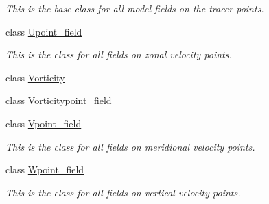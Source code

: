\begin{DoxyCompactItemize}
\begin{DoxyCompactList}\small\item\em This is the base class for all model fields on the tracer points. \end{DoxyCompactList}\item 
class \hyperlink{classmitgcm_1_1core_1_1Upoint__field}{Upoint\+\_\+field}
\begin{DoxyCompactList}\small\item\em This is the class for all fields on zonal velocity points. \end{DoxyCompactList}\item 
class \hyperlink{classmitgcm_1_1core_1_1Vorticity}{Vorticity}
\item 
class \hyperlink{classmitgcm_1_1core_1_1Vorticitypoint__field}{Vorticitypoint\+\_\+field}
\item 
class \hyperlink{classmitgcm_1_1core_1_1Vpoint__field}{Vpoint\+\_\+field}
\begin{DoxyCompactList}\small\item\em This is the class for all fields on meridional velocity points. \end{DoxyCompactList}\item 
class \hyperlink{classmitgcm_1_1core_1_1Wpoint__field}{Wpoint\+\_\+field}
\begin{DoxyCompactList}\small\item\em This is the class for all fields on vertical velocity points. \end{DoxyCompactList}\end{DoxyCompactItemize}
